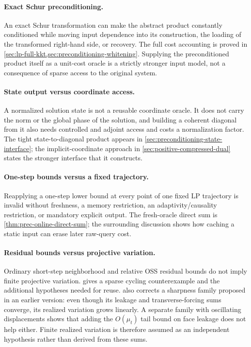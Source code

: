 \paragraph{Exact Schur preconditioning.}
An exact Schur transformation can make the abstract product constantly
conditioned while moving input dependence into its construction, the loading
of the transformed right-hand side, or recovery.  The full cost accounting is
proved in
\cref{sec:lp-full-kkt,sec:preconditioning-whitening}.  Supplying the
preconditioned product itself as a unit-cost oracle is a strictly stronger
input model, not a consequence of sparse access to the original system.

\paragraph{State output versus coordinate access.}
A normalized solution state is not a reusable coordinate oracle.  It does
not carry the norm or the global phase of the solution, and building a
coherent diagonal from it also needs controlled and adjoint access and costs
a normalization factor.  The tight state-to-diagonal product appears in
\cref{sec:preconditioning-state-interface}; the implicit-coordinate approach
in \cref{sec:positive-compressed-dual} states the stronger interface that it
constructs.

\paragraph{One-step bounds versus a fixed trajectory.}
Reapplying a one-step lower bound at every point of one fixed LP trajectory
is invalid without freshness, a memory restriction, an adaptivity/causality
restriction, or mandatory explicit output.  The fresh-oracle direct sum is
\cref{thm:prec-online-direct-sum}; the surrounding discussion shows how
caching a static input can erase later raw-query cost.

\paragraph{Residual bounds versus projective variation.}
Ordinary short-step neighborhood and relative OSS residual bounds do not
imply finite projective variation.   gives a
sparse cycling counterexample and the additional hypotheses needed for
reuse.   also corrects a sharpness family
proposed in an earlier version: even though its leakage and
transverse-forcing sums converge, its realized variation grows linearly.  A
separate family with oscillating displacements shows that adding the
$O(\mu_t)$ tail bound on face leakage does not help either.  Finite realized
variation is therefore assumed as an independent hypothesis rather than
derived from these sums.

